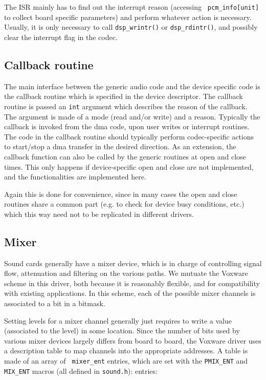 \documentclass[11pt]{article}
\begin{document}
The ISR mainly has to find out the interrupt reason (accessing {\tt
pcm\_info[unit]} to collect board specific parameters) and perform
whatever action is necessary. Usually, it is only necessary to call
{\tt dsp\_wrintr()} or {\tt dsp\_rdintr()}, and possibly clear the
interrupt flag in the codec.

\subsection{Callback routine}

The main interface between the generic audio code and the device
specific code is the callback routine which is specified in the device
descriptor. The callback routine is passed an {\tt int} argument which
describes the reason of the callback. The argument is made of a mode
(read and/or write) and a reason. Typically the callback is invoked
from the dma code, upon user writes or interrupt routines. The code in
the callback routine should typically perform codec-specific actions
to start/stop a dma transfer in the desired direction.
As an extension, the callback function can also be called by the
generic routines at open and close times. This only happens if
device-specific open and close are not implemented, and the
functionalities are implemented here.

Again this is done for convenience, since in many cases the open and
close routines share a common part (e.g. to check for device busy
conditions, etc.) which this way need not to be replicated in
different drivers.

\subsection{Mixer}

Sound cards generally have a mixer device, which is in charge of
controlling signal flow, attenuation and filtering on the various
paths. We mutuate the Voxware scheme in this driver, both because it
is reasonably flexible, and for compatibility with existing
applications. In this scheme, each of the possible mixer channels is
associated to a bit in a bitmask.

Setting levels for a mixer channel generally just requires to write a
value (associated to the level) in some location. Since the number of
bits used by various mixer devices largely differs from board to
board, the Voxware driver uses a description table to map channels
into the appropriate addresses. A table is made of an array of {\tt
mixer\_ent} entries, which are set with the {\tt PMIX\_ENT} and
{\tt MIX\_ENT} macros (all defined in {\tt sound.h}):
entries:
\end{document}
